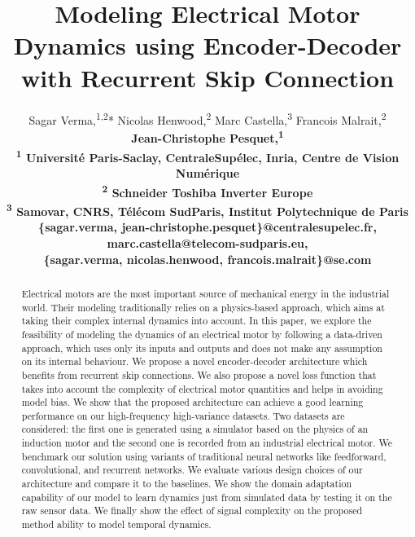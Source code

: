 \documentclass[letterpaper]{article}
\title{Modeling Electrical Motor Dynamics using Encoder-Decoder with Recurrent Skip Connection}
\author{
Sagar Verma,\textsuperscript{\rm 1}\textsuperscript{,}\textsuperscript{\rm 2}*
Nicolas Henwood,\textsuperscript{\rm 2}
Marc Castella,\textsuperscript{\rm 3}
Francois Malrait,\textsuperscript{\rm 2} \\
\bf \Large Jean-Christophe Pesquet,\textsuperscript{\rm 1} \\
\textsuperscript{\rm 1} Universit\'{e} Paris-Saclay, CentraleSup\'{e}lec, Inria, Centre de Vision Num\'{e}rique \\
\textsuperscript{\rm 2} Schneider Toshiba Inverter Europe \\
\textsuperscript{\rm 3} Samovar, CNRS, T\'{e}l\'{e}com SudParis, Institut Polytechnique de Paris\\
\{sagar.verma, jean-christophe.pesquet\}@centralesupelec.fr, marc.castella@telecom-sudparis.eu, \\
\{sagar.verma, nicolas.henwood, francois.malrait\}@se.com}
\begin{document}
\maketitle

\begin{abstract}
Electrical motors are the most important source of mechanical energy in the industrial world. Their modeling traditionally relies on a physics-based approach, which aims at taking their complex internal dynamics into account. In this paper, we explore the feasibility of modeling the dynamics of an electrical motor  by following a data-driven approach, which uses only its inputs and outputs and does not make any assumption on its internal behaviour. We propose a novel encoder-decoder architecture which benefits from recurrent skip connections. We also propose a novel loss function that takes into account the complexity of electrical motor quantities and helps in avoiding model bias. We show that the proposed architecture can achieve a good learning performance on our high-frequency high-variance datasets. Two datasets are considered: the first one is generated using a simulator based on the physics of an induction motor and the second one is recorded from an industrial electrical motor. We benchmark our solution using variants of traditional neural networks like feedforward, convolutional, and recurrent networks. We evaluate various design choices of our architecture and compare it to the baselines. We show the domain adaptation capability of our model to learn dynamics just from simulated data by testing it on the raw sensor data. We finally show the effect of signal complexity on the proposed method ability to model temporal dynamics.
\end{abstract}
\end{document}
